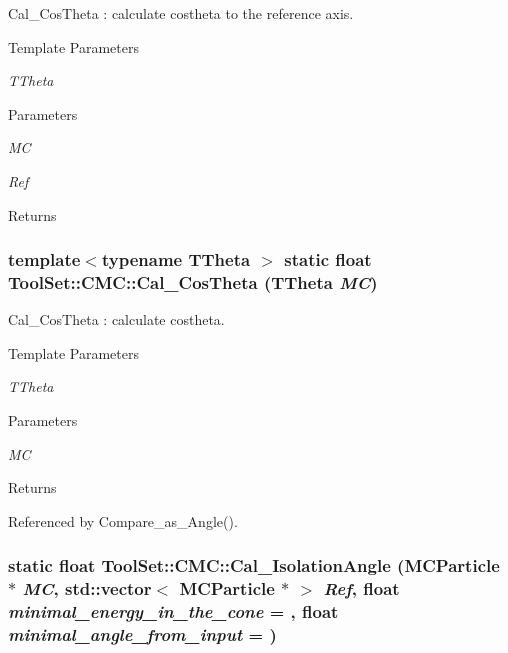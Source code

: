 Cal\_\-CosTheta : calculate costheta to the reference axis. 
\begin{DoxyTemplParams}{Template Parameters}
\item[{\em TTheta}]\end{DoxyTemplParams}

\begin{DoxyParams}{Parameters}
\item[{\em MC}]\item[{\em Ref}]\end{DoxyParams}
\begin{DoxyReturn}{Returns}

\end{DoxyReturn}
\hypertarget{classToolSet_1_1CMC_a7142700aa3c1b586b976e9d71301c7bc}{
\subsubsection[{Cal\_\-CosTheta}]{\setlength{\rightskip}{0pt plus 5cm}template$<$typename TTheta $>$ static float ToolSet::CMC::Cal\_\-CosTheta (TTheta {\em MC})}}
\label{classToolSet_1_1CMC_a7142700aa3c1b586b976e9d71301c7bc}


Cal\_\-CosTheta : calculate costheta. 
\begin{DoxyTemplParams}{Template Parameters}
\item[{\em TTheta}]\end{DoxyTemplParams}

\begin{DoxyParams}{Parameters}
\item[{\em MC}]\end{DoxyParams}
\begin{DoxyReturn}{Returns}

\end{DoxyReturn}


Referenced by Compare\_\-as\_\-Angle().\hypertarget{classToolSet_1_1CMC_a3d0ff5af967b32efbc5907174b64348f}{
\subsubsection[{Cal\_\-IsolationAngle}]{\setlength{\rightskip}{0pt plus 5cm}static float ToolSet::CMC::Cal\_\-IsolationAngle (MCParticle $\ast$ {\em MC}, \/  std::vector$<$ MCParticle $\ast$ $>$ {\em Ref}, \/  float {\em minimal\_\-energy\_\-in\_\-the\_\-cone} = {}, \/  float {\em minimal\_\-angle\_\-from\_\-input} = {})}}
\label{classToolSet_1_1CMC_a3d0ff5af967b32efbc5907174b64348f}


